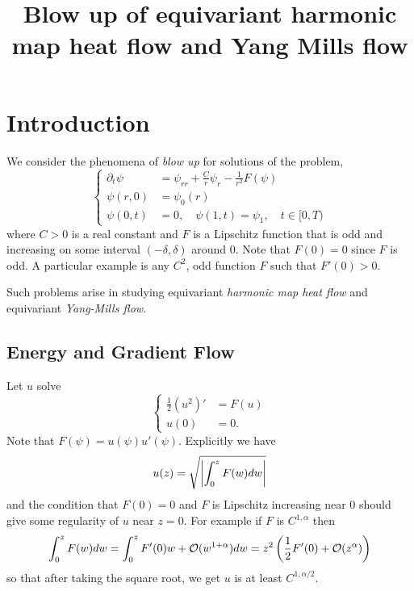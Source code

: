 \documentclass{amsart}
\begin{document}
\title[]
 {Blow up of equivariant harmonic map heat flow and Yang Mills flow}

\curraddr{}
\email{}

\dedicatory{}
\subjclass[2010]{}
\keywords{}

\begin{abstract}
\end{abstract}

\maketitle

\section{Introduction}
\label{sec:intro}

We consider the phenomena of \emph{blow up} for solutions of the problem,
\begin{equation}
\label{eq:pde}
\begin{cases}
\partial_t \psi &= \psi_{rr} + \frac{C}{r} \psi_r - \frac{1}{r^2} F(\psi) \\
\psi(r, 0) &= \psi_0(r) \\
\psi(0, t) &= 0, \quad \psi(1, t) = \psi_1, \quad t \in [0, T)
\end{cases}
\end{equation}
where \(C > 0\) is a real constant and \(F\) is a Lipschitz function that is odd and increasing on some interval \((-\delta, \delta)\) around \(0\). Note that \(F(0) = 0\) since \(F\) is odd. A particular example is any \(C^2\), odd function \(F\) such that \(F'(0) > 0\).

Such problems arise in studying equivariant \emph{harmonic map heat flow} and equivariant \emph{Yang-Mills flow}.

\subsection{Energy and Gradient Flow}

Let \(u\) solve
\[
\begin{cases}
\frac{1}{2} (u^2)' &= F(u) \\
u(0) &= 0.
\end{cases}
\]
Note that \(F(\psi) = u(\psi) u'(\psi)\). Explicitly we have
\[
u(z) = \sqrt{\left|{\int_0^z F(w) dw}\right|}
\]
and the condition that \(F(0) = 0\) and \(F\) is Lipschitz increasing near \(0\) should give some regularity of \(u\) near \(z = 0\). For example if \(F\) is \(C^{1,\alpha}\) then
\[
\int_0^z F(w) dw = \int_0^z F'(0) w + \operatorname{\mathcal{O}}(w^{1+\alpha}) dw = z^2\left(\frac{1}{2} F'(0) + \operatorname{\mathcal{O}}(z^{\alpha})\right)
\]
so that after taking the square root, we get \(u\) is at least \(C^{1,\alpha/2}\).
\end{document}
